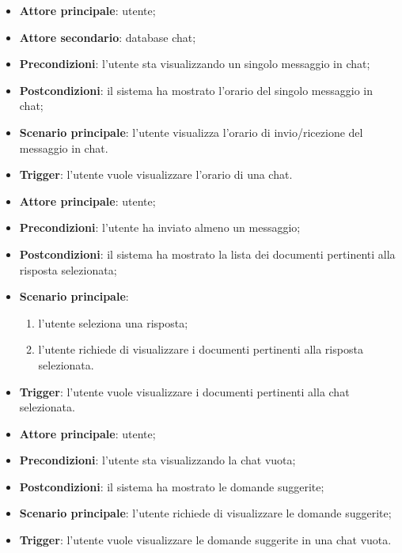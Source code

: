 \documentclass[10pt, a4paper]{article}
\begin{document}
    \begin{itemize}
        \item \textbf{Attore principale}: utente;
        \item \textbf{Attore secondario}: database chat;
        \item \textbf{Precondizioni}: l’utente sta visualizzando un singolo messaggio in chat;
        \item \textbf{Postcondizioni}: il sistema ha mostrato l'orario del singolo messaggio in chat;
        \item \textbf{Scenario principale}: l’utente visualizza l'orario di invio/ricezione del messaggio in chat.
        \item \textbf{Trigger}: l’utente vuole visualizzare l'orario di una chat.
    \end{itemize}

    \begin{itemize}
        \item \textbf{Attore principale}: utente;
        \item \textbf{Precondizioni}: l’utente ha inviato almeno un messaggio;
        \item \textbf{Postcondizioni}: il sistema ha mostrato la lista dei documenti pertinenti alla risposta selezionata;
        \item \textbf{Scenario principale}:
            \begin{enumerate}
                \item l’utente seleziona una risposta;
                \item l’utente richiede di visualizzare i documenti pertinenti alla risposta selezionata.
            \end{enumerate}
        \item \textbf{Trigger}: l’utente vuole visualizzare i documenti pertinenti alla chat selezionata.
    \end{itemize}

    \begin{itemize}
        \item \textbf{Attore principale}: utente;
        \item \textbf{Precondizioni}: l’utente sta visualizzando la chat vuota;
        \item \textbf{Postcondizioni}: il sistema ha mostrato le domande suggerite;
        \item \textbf{Scenario principale}: l’utente richiede di visualizzare le domande suggerite;
        \item \textbf{Trigger}: l’utente vuole visualizzare le domande suggerite in una chat vuota.
    \end{itemize}
\end{document}
